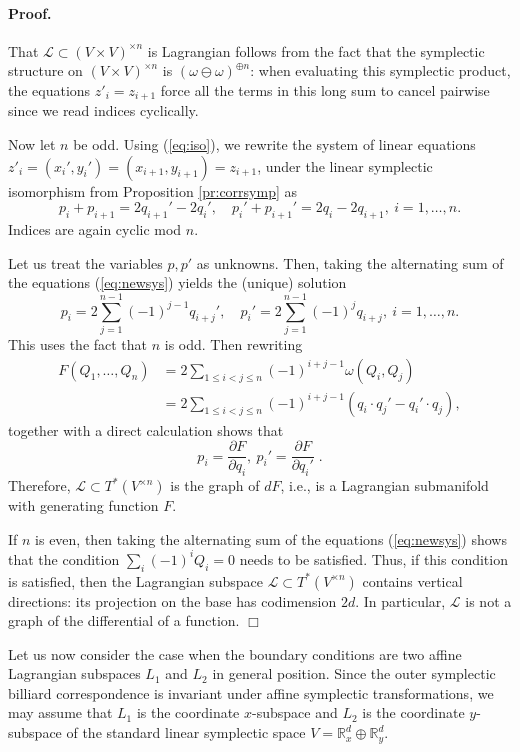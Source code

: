\documentclass[12pt]{article}
\newcommand{\proofend}{$\Box$\bigskip}
\newcommand{\R}{{\mathbb R}}
\def\proof{\paragraph{Proof.}}
\begin{document}
\proof
That ${\mathscr{L}} \subset (V\times V)^{\times n}$ is Lagrangian follows from the fact that the symplectic structure on $(V \times V)^{\times n}$ is $(\omega \ominus \omega)^{\oplus n}$: when evaluating this symplectic product, the equations $z'_i = z_{i+1}$ force all the terms in this long sum to cancel pairwise since we read indices cyclically.

Now let $n$ be odd.
Using (\ref{eq:iso}), we rewrite the system of linear equations $z'_i =(x_i',y_i')=(x_{i+1},y_{i+1})= z_{i+1}$, under the linear symplectic isomorphism from Proposition \ref{pr:corrsymp} as
\begin{equation} \label{eq:newsys}
p_i+p_{i+1}=2q_{i+1}'-2q_i',\quad p_i'+p_{i+1}'=2q_i - 2q_{i+1}, \ i=1,\ldots,n.
\end{equation}
Indices are again cyclic mod $n$. 

Let us treat the variables $p,p'$ as unknowns. Then, taking the alternating sum of the equations (\ref{eq:newsys}) yields the (unique) solution
$$
p_i=2 \sum_{j=1}^{n-1} (-1)^{j-1} q_{i+j}',\quad p_i'=2 \sum_{j=1}^{n-1} (-1)^{j} q_{i+j},\ i=1,\ldots,n.
$$
This uses the fact that $n$ is odd. Then rewriting 
\begin{equation}\nonumber
\begin{aligned}
F(Q_1,\ldots,Q_n) &= 2 \sum_{1\le i < j \le n} (-1)^{i+j-1} \omega(Q_i,Q_j)\\
&=2 \sum_{1\le i < j \le n} (-1)^{i+j-1} (q_i \cdot q_j' - q_i' \cdot q_j),
\end{aligned}
\end{equation}
together with a direct calculation shows that
$$
p_i=\frac{\partial F}{\partial q_i},\ p_i'=\frac{\partial F}{\partial q_i'}\;.
$$
Therefore, ${\mathscr{L}} \subset T^* (V^{\times n})$ is the graph of $dF$, i.e., is a Lagrangian submanifold with  generating function $F$.

If $n$ is even, then taking the alternating sum of the equations (\ref{eq:newsys}) shows that the condition $\sum_i (-1)^i Q_i =0$ needs to be satisfied. Thus, if this condition is satisfied, then the Lagrangian subspace ${\mathscr{L}} \subset T^* (V^{\times n})$ contains vertical directions: its projection on the base has codimension $2d$. In particular, ${\mathscr{L}}$ is not a graph of the differential of a function.
\proofend

Let us now consider the case when the boundary conditions are two affine Lagrangian subspaces $L_1$ and $L_2$ in general position. Since the outer symplectic billiard correspondence is invariant under affine symplectic transformations, we may assume that $L_1$ is the coordinate $x$-subspace and $L_2$ is the coordinate $y$-subspace of the standard linear symplectic space $V=\R^d_x \oplus \R^d_y$.
\end{document}
